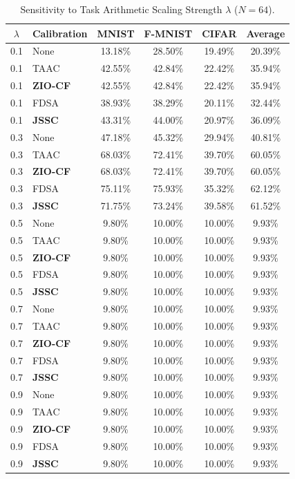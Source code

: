 \documentclass{article}
\begin{document}
\begin{table}[tb]
\centering
\caption{Sensitivity to Task Arithmetic Scaling Strength $\lambda$ ($N=64$).}
\label{tab:lambda_sensitivity}
\vskip 0.1in
\begin{tabular}{clcccc}
\toprule
\textbf{$\lambda$} & \textbf{Calibration} & \textbf{MNIST} & \textbf{F-MNIST} & \textbf{CIFAR} & \textbf{Average} \\
\midrule
0.1 & None & 13.18\% & 28.50\% & 19.49\% & 20.39\% \\
0.1 & TAAC & 42.55\% & 42.84\% & 22.42\% & 35.94\% \\
0.1 & \textbf{ZIO-CF} & 42.55\% & 42.84\% & 22.42\% & 35.94\% \\
0.1 & FDSA & 38.93\% & 38.29\% & 20.11\% & 32.44\% \\
0.1 & \textbf{JSSC} & 43.31\% & 44.00\% & 20.97\% & 36.09\% \\
\hline
0.3 & None & 47.18\% & 45.32\% & 29.94\% & 40.81\% \\
0.3 & TAAC & 68.03\% & 72.41\% & 39.70\% & 60.05\% \\
0.3 & \textbf{ZIO-CF} & 68.03\% & 72.41\% & 39.70\% & 60.05\% \\
0.3 & FDSA & 75.11\% & 75.93\% & 35.32\% & 62.12\% \\
0.3 & \textbf{JSSC} & 71.75\% & 73.24\% & 39.58\% & 61.52\% \\
\hline
0.5 & None & 9.80\% & 10.00\% & 10.00\% & 9.93\% \\
0.5 & TAAC & 9.80\% & 10.00\% & 10.00\% & 9.93\% \\
0.5 & \textbf{ZIO-CF} & 9.80\% & 10.00\% & 10.00\% & 9.93\% \\
0.5 & FDSA & 9.80\% & 10.00\% & 10.00\% & 9.93\% \\
0.5 & \textbf{JSSC} & 9.80\% & 10.00\% & 10.00\% & 9.93\% \\
\hline
0.7 & None & 9.80\% & 10.00\% & 10.00\% & 9.93\% \\
0.7 & TAAC & 9.80\% & 10.00\% & 10.00\% & 9.93\% \\
0.7 & \textbf{ZIO-CF} & 9.80\% & 10.00\% & 10.00\% & 9.93\% \\
0.7 & FDSA & 9.80\% & 10.00\% & 10.00\% & 9.93\% \\
0.7 & \textbf{JSSC} & 9.80\% & 10.00\% & 10.00\% & 9.93\% \\
\hline
0.9 & None & 9.80\% & 10.00\% & 10.00\% & 9.93\% \\
0.9 & TAAC & 9.80\% & 10.00\% & 10.00\% & 9.93\% \\
0.9 & \textbf{ZIO-CF} & 9.80\% & 10.00\% & 10.00\% & 9.93\% \\
0.9 & FDSA & 9.80\% & 10.00\% & 10.00\% & 9.93\% \\
0.9 & \textbf{JSSC} & 9.80\% & 10.00\% & 10.00\% & 9.93\% \\
\bottomrule
\end{tabular}
\end{table}
\end{document}
